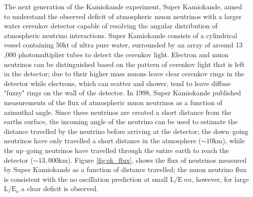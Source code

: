 The next generation of the Kamiokande experiment, Super Kamiokande, aimed to
understand the observed deficit of atmospheric muon neutrinos with a larger 
water cerenkov detector capable of resolving the angular distribution of 
atmospheric neutrino interactions. Super Kamiokande consists of a cylindrical 
vessel containing 50kt of ultra pure water, surrounded by an array of around 13
,000 photomultiplier tubes to detect the cerenkov light. Electron and muon 
neutrinos can be distinguished based on the pattern of cerenkov light that is 
left in the detector; due to their higher mass muons leave clear cerenkov 
rings in the detector while electrons, which can scatter and shower, tend to 
leave diffuse "fuzzy" rings on the wall of the detector. In 1998, Super 
Kamiokande published measurements of the flux of atmospheric muon neutrinos as 
a function of azimuthal angle. Since these neutrinos are created a short 
distance from the earths surface, the incoming angle of the neutrino can be 
used to estimate the distance travelled by the neutrino before arriving at the 
detector; the down--going neutrinos have only travelled a short distance in 
the atmosphere (\(\sim 10\mbox{km}\)), while the up--going neutrinos have 
travelled through the entire earth to reach the detector (\(\sim 13,000\mbox{km
}\)). Figure \ref{fig:sk_flux}, shows the flux of neutrinos measured by Super 
Kamiokande as a function of distance travelled; the muon neutrino flux is 
consistent with the no oscillation prediction at small \(\mbox{L} / \mbox{E}_\
nu\), however, for large \(\mbox{L} / \mbox{E}_\nu\) a clear deficit is 
observed. 

